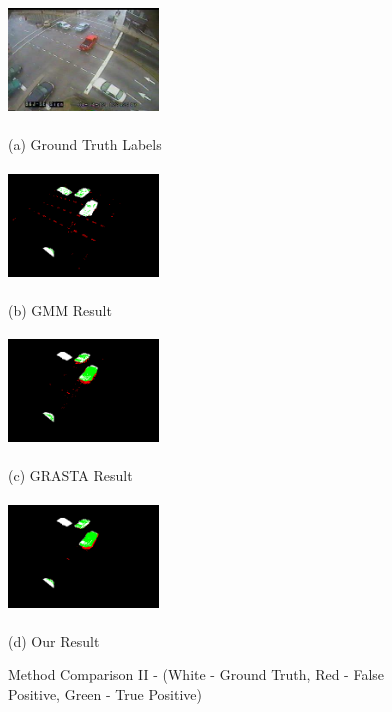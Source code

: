 \documentclass{article}
\begin{document}
\begin{figure}[t]
\centering
\begin{minipage}[b]{0.48\linewidth}
  \centering
  \centerline{\includegraphics[width=4cm, height=3cm]{Imgs/0412041242.jpg}}
  \centerline{(a) Ground Truth Labels}\medskip
\end{minipage}
\begin{minipage}[b]{0.48\linewidth}
  \centering
  \centerline{\includegraphics[width=4cm, height=3cm]{Imgs/0412041242_gmm_rwg.png}}
  \centerline{(b) GMM Result}\medskip
\end{minipage}

\begin{minipage}[b]{0.48\linewidth}
  \centering
  \centerline{\includegraphics[width=4cm, height =3cm]{Imgs/0412041242_grasta_rwg.png}}
  \centerline{(c) GRASTA Result}\medskip
\end{minipage}
\begin{minipage}[b]{0.48\linewidth}
  \centering
  \centerline{\includegraphics[width=4cm, height = 3cm]{Imgs/0412041242_rpca_rwg.png}}
  \centerline{(d) Our Result}\medskip
\end{minipage}

\caption{Method Comparison II - (White - Ground Truth, Red - False Positive, Green -  True Positive)}
\label{fig:methodComp2}
%
\end{figure}
\end{document}
